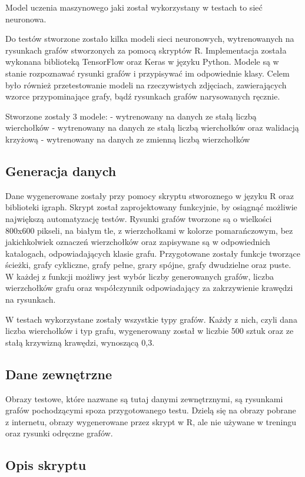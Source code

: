 Model uczenia maszynowego jaki został wykorzystany w testach to sieć neuronowa.

Do testów stworzone zostało kilka modeli sieci neuronowych,
wytrenowanych na rysunkach grafów stworzonych za pomocą skryptów R.
Implementacja została wykonana biblioteką TensorFlow oraz Keras w języku Python.
Modele są w stanie rozpoznawać rysunki grafów i przypisywać im odpowiednie klasy.
Celem było również przetestowanie modeli na rzeczywistych zdjęciach,
zawierających wzorce przypominające grafy, bądź rysunkach grafów narysowanych ręcznie.

Stworzone zostały 3 modele:
- wytrenowany na danych ze stałą liczbą wierchołków
- wytrenowany na danych ze stałą liczbą wierchołków oraz walidacją krzyżową
- wytrenowany na danych ze zmienną liczbą wierzchołków

\subsection{Generacja danych}
Dane wygenerowane zostały przy pomocy skryptu stworoznego w języku R oraz biblioteki igraph.
Skrypt został zaprojektowany funkcyjnie, by osiągnąć możliwie największą automatyzację testów.
Rysunki grafów tworzone są o wielkości 800x600 pikseli, na białym tle, z wierzchołkami w kolorze pomarańczowym,
bez jakichkolwiek oznaczeń wierzchołków oraz zapisywane są w odpowiednich katalogach, odpowiadających klasie grafu.
Przygotowane zostały funkcje tworzące ścieżki, grafy cykliczne, grafy pełne, grary spójne, grafy dwudzielne oraz puste.
W każdej z funkcji możliwy jest wybór liczby generowanych grafów, liczba wierzchołków grafu
oraz współczynnik odpowiadający za zakrzywienie krawędzi na rysunkach.

W testach wykorzystane zostały wszystkie typy grafów.
Każdy z nich, czyli dana liczba wierchołków i typ grafu, wygenerowany został w liczbie 500 sztuk
oraz ze stałą krzywizną krawędzi, wynoszącą 0,3.

\subsection{Dane zewnętrzne}
Obrazy testowe, które nazwane są tutaj danymi zewnętrznymi, są rysunkami grafów pochodzącymi spoza przygotowanego testu.
Dzielą się na obrazy pobrane z internetu, obrazy wygenerowane przez skrypt w R, ale nie używane w treningu
oraz rysunki odręczne grafów.

\subsection{Opis skryptu}


